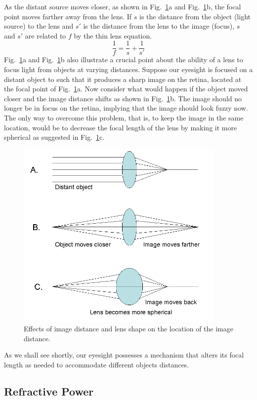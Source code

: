 As the distant source moves closer, as shown in Fig.~\ref{Fig5-5}a and Fig.~\ref{Fig5-5}b, the focal point moves farther away from the lens. If $s$ is the distance from the object (light source) to the lens and $s'$ is the distance from the lens to the image (focus), $s$ and $s'$ are related to $f$ by the thin lens equation.
\begin{equation}\label{eqn5-3}
\frac{1}{f} = \frac{1}{s} + \frac{1}{s'}
\end{equation}
Fig.~\ref{Fig5-5}a and Fig.~\ref{Fig5-5}b also illustrate a crucial point about the ability of a lens to focus light from objects at varying distances. Suppose our eyesight is focused on a distant object to such that it produces a sharp image on the retina, located at the focal point of Fig.~\ref{Fig5-5}a. Now consider what would happen if the object moved closer and the image distance shifts as shown in Fig.~\ref{Fig5-5}b. The image should no longer be in focus on the retina, implying that the image should look fuzzy now. The only way to overcome this problem, that is, to keep the image in the same location, would be to decrease the focal length of the lens by making it more spherical as suggested in Fig.~\ref{Fig5-5}c. 
\begin{figure}[htb]
	\centering
	\includegraphics[width=4.0in]{./figures/Topic5/Fig5-5.png}
	\caption{Effects of image distance and lens shape on the location of the image distance.}
	\label{Fig5-5}
\end{figure}
As we shall see shortly, our eyesight possesses a mechanism that alters its focal length as needed to accommodate different objects distances.

\subsection{Refractive Power}

